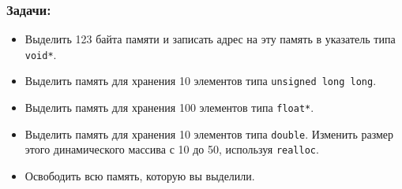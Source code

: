 \documentclass{article}
\begin{document}
\subsubsection*{Задачи:}
\begin{itemize}
\item Выделить 123 байта памяти и записать адрес на эту память в указатель типа \texttt{void*}.
\item Выделить память для хранения 10 элементов типа \texttt{unsigned long long}.
\item Выделить память для хранения 100 элементов типа \texttt{float*}.
\item Выделить память для хранения 10 элементов типа \texttt{double}. Изменить размер этого динамического массива с 10 до 50, используя \texttt{realloc}.
\item Освободить всю память, которую вы выделили.
\end{itemize}

\newpage
\end{document}
